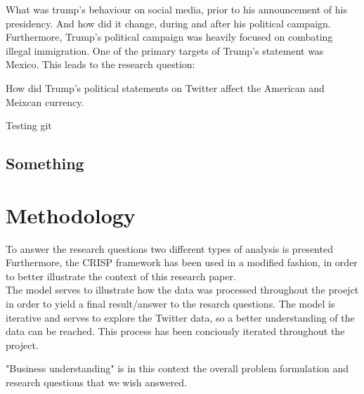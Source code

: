 \documentclass{article}
\begin{document}
\par\vspace{10pt}

What was trump's behaviour on social media, prior to his announcement of his presidency. And how did it change, during and after his political campaign.\\

Furthermore, Trump's political campaign was heavily focused on combating illegal immigration. One of the primary targets of Trump's statement was Mexico.
This leads to the research question:

How did Trump's political statements on Twitter affect the American and Meixcan currency.

Testing git

\par\vspace{10pt}






\subsection{Something}




\section{Methodology}
To answer the research questions two different types of analysis is presented\\
Furthermore,  the CRISP framework has been used in a modified fashion, in order to better illustrate the context of this research paper.\\
The model serves to illustrate how the data was processed throughout the proejct in order to yield a final result/answer to the resarch questions. The model is iterative and serves to explore the Twitter data, so a better
understanding of the data can be reached. This process has been conciously iterated throughout the project.

"Business understanding" is in this context the overall problem formulation and research questions that we wish answered.


\end{document}
